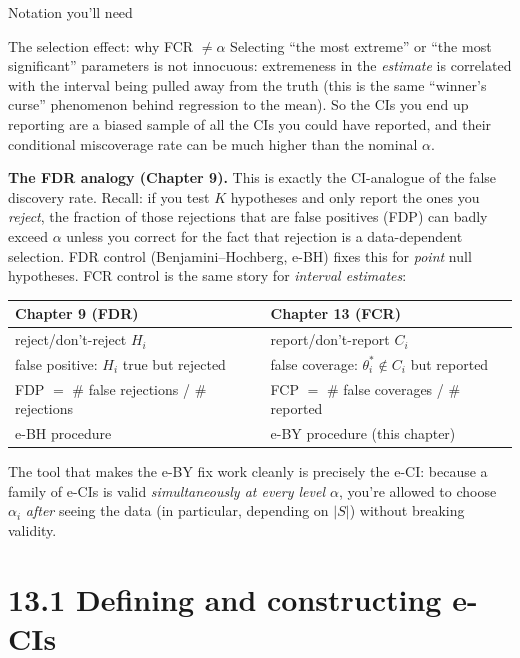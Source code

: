 \documentclass[aspectratio=169,10pt]{beamer}
\begin{document}
\begin{frame}[allowframebreaks]{Notation you'll need}
  \framebreak

  \begin{block}{The selection effect: why FCR $\neq \alpha$}
    Selecting ``the most extreme'' or ``the most significant'' parameters is not innocuous: extremeness in the \emph{estimate} is correlated with the interval being pulled away from the truth (this is the same ``winner's curse'' phenomenon behind regression to the mean). So the CIs you end up reporting are a biased sample of all the CIs you could have reported, and their conditional miscoverage rate can be much higher than the nominal $\alpha$.
  \end{block}

  \framebreak

  \textbf{The FDR analogy (Chapter 9).} This is exactly the CI-analogue of the false discovery rate. Recall: if you test $K$ hypotheses and only report the ones you \emph{reject}, the fraction of those rejections that are false positives (FDP) can badly exceed $\alpha$ unless you correct for the fact that rejection is a data-dependent selection. FDR control (Benjamini--Hochberg, e-BH) fixes this for \emph{point} null hypotheses. FCR control is the same story for \emph{interval estimates}:
  \begin{center}
    \begin{tabular}{ll}
      \toprule
      Chapter 9 (FDR) & Chapter 13 (FCR) \\
      \midrule
      reject/don't-reject $H_i$ & report/don't-report $C_i$ \\
      false positive: $H_i$ true but rejected & false coverage: $\theta_i^* \notin C_i$ but reported \\
      FDP $=$ \# false rejections / \# rejections & FCP $=$ \# false coverages / \# reported \\
      e-BH procedure & e-BY procedure (this chapter) \\
      \bottomrule
    \end{tabular}
  \end{center}
  The tool that makes the e-BY fix work cleanly is precisely the e-CI: because a family of e-CIs is valid \emph{simultaneously at every level $\alpha$}, you're allowed to choose $\alpha_i$ \emph{after} seeing the data (in particular, depending on $|S|$) without breaking validity.

\end{frame}

\section{13.1 Defining and constructing e-CIs}
\end{document}
